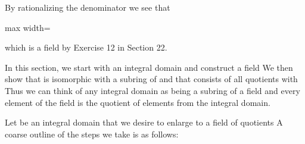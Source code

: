 \documentclass[11pt,oneside]{article}
\begin{document}
\begin{BookBody}
\noindent By rationalizing the denominator we see that

\begin{center}\begin{adjustbox}{max width=\linewidth}\end{adjustbox}\end{center}

\noindent which is a field by Exercise 12 in Section 22. \BookEnd{\blacktriangle}

In this section, we start with an integral domain  and construct a field  We then show that  is isomorphic with a subring  of  and that  consists of all quotients  with  Thus we can think of any integral domain as being a subring of a field and every element of the field is the quotient of elements from the integral domain.


\noindent Let  be an integral domain that we desire to enlarge to a field of quotients  A coarse outline of the steps we take is as follows:



\end{BookBody}

\BookNarrativetrue
\end{document}

